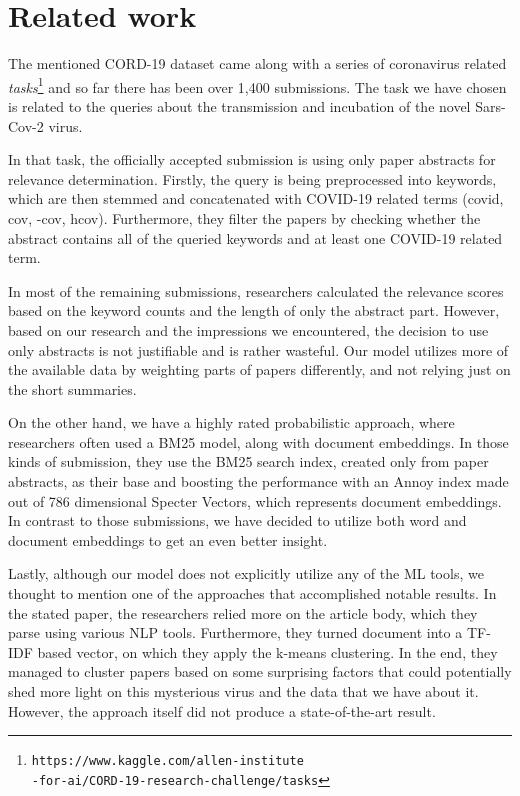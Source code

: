 \documentclass[10pt, a4paper]{article}
\begin{document}
	\section{Related work}
	
	The mentioned CORD-19 dataset came along with a series of coronavirus related \emph{tasks}\footnote{\texttt{https://www.kaggle.com/allen-institute\\-for-ai/CORD-19-research-challenge/tasks}} and so far there has been over 1,400 submissions. The task we have chosen is related to the queries about the transmission and incubation of the novel Sars-Cov-2 virus.
	
	In that task, the officially accepted submission is using only paper abstracts for relevance determination. Firstly, the query is being preprocessed into keywords, which are then stemmed and concatenated with COVID-19 related terms (covid, cov, -cov, hcov). Furthermore, they filter the papers by checking whether the abstract contains all of the queried keywords and at least one COVID-19 related term. 
	
	In most of the remaining submissions, researchers calculated the relevance scores based on the keyword counts and the length of only the abstract part. However, based on our research and the impressions we encountered, the decision to use only abstracts is not justifiable and is rather wasteful. Our model utilizes more of the available data by weighting parts of papers differently, and not relying just on the short summaries.
	
	On the other hand, we have a highly rated probabilistic approach, where researchers often used a BM25 model, along with document embeddings. In those kinds of submission, they use the BM25 search index, created only from paper abstracts, as their base and boosting the performance with an Annoy index made out of 786 dimensional Specter Vectors, which represents document embeddings. In contrast to those submissions, we have decided to utilize both word and document embeddings to get an even better insight. 
	
	Lastly, although our model does not explicitly utilize any of the ML tools, we thought to mention one of the approaches that accomplished notable results. In the stated paper, the researchers relied more on the article body, which they parse using various NLP tools. Furthermore, they turned document into a TF-IDF based vector, on which they apply the k-means clustering. In the end, they managed to cluster papers based on some surprising factors that could potentially shed more light on this mysterious virus and the data that we have about it. However, the approach itself did not produce a state-of-the-art result.
	
\end{document}
